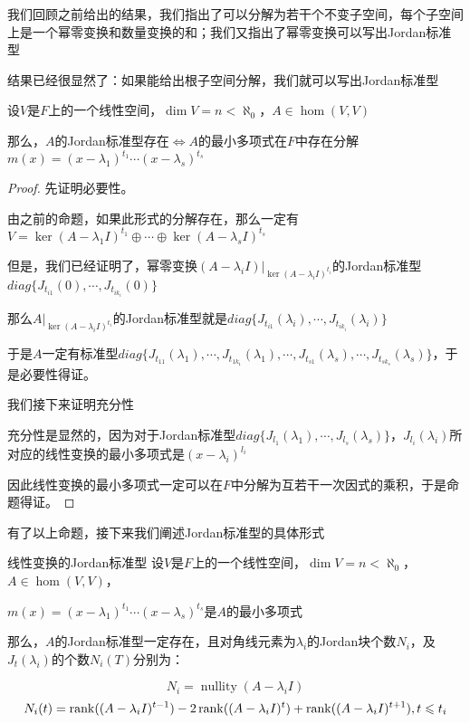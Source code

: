 \documentclass[12pt, a4paper, oneside, UTF8]{ctexbook}
\begin{document}
			我们回顾之前给出的结果，我们指出了可以分解为若干个不变子空间，每个子空间上是一个幂零变换和数量变换的和；我们又指出了幂零变换可以写出Jordan标准型

			结果已经很显然了：如果能给出根子空间分解，我们就可以写出Jordan标准型
			\begin{proposition}
				设$V$是$F$上的一个线性空间，$\dim V = n < \aleph_0$，$A \in \hom(V,V)$
							
				那么，$A$的Jordan标准型存在$ \Leftrightarrow A$的最小多项式在$F$中存在分解$m(x)=(x-\lambda_1)^{t_1}\cdots (x-\lambda_s)^{t_s}$
			\end{proposition}
			\begin{proof}
				先证明必要性。

				由之前的命题，如果此形式的分解存在，那么一定有$V = \ker (A-\lambda_1 I)^{t_1}\oplus \cdots \oplus \ker (A-\lambda_s I)^{t_s}$

				但是，我们已经证明了，幂零变换$(A-\lambda_i I)|_{\ker (A-\lambda_i I)^{t_i}}$的Jordan标准型$diag\{J_{t_{i1}}(0),\cdots,J_{t_{ik_i}}(0)\}$

				那么$A|_{\ker (A-\lambda_i I)^{t_i}}$的Jordan标准型就是$diag\{J_{t_{i1}}(\lambda_i),\cdots,J_{t_{ik_i}}(\lambda_i)\}$

				于是$A$一定有标准型$diag\{J_{t_{11}}(\lambda_1),\cdots,J_{t_{1k_1}}(\lambda_1),\cdots,J_{t_{s1}}(\lambda_s),\cdots,J_{t_{sk_s}}(\lambda_s)\}$，于是必要性得证。

				我们接下来证明充分性

				充分性是显然的，因为对于Jordan标准型$diag\{J_{l_1}(\lambda_1),\cdots,J_{l_s}(\lambda_s)\}$，$J_{l_i}(\lambda_i)$所对应的线性变换的最小多项式是$(x-\lambda_i)^{l_i}$

				因此线性变换的最小多项式一定可以在$F$中分解为互若干一次因式的乘积，于是命题得证。
			\end{proof}
			有了以上命题，接下来我们阐述Jordan标准型的具体形式
			\begin{them}{线性变换的Jordan标准型}{}
				设$V$是$F$上的一个线性空间，$\dim V = n < \aleph_0$，$A \in \hom(V,V)$，
							
				$m(x)=(x-\lambda_1)^{t_1}\cdots (x-\lambda_s)^{t_s}$是$A$的最小多项式

				那么，$A$的Jordan标准型一定存在，且对角线元素为$\lambda_i$的Jordan块个数$N_i$，及$J_{t}(\lambda_i)$的个数$N_i(T)$分别为：

				\begin{equation}
					N_i = \operatorname{nullity}(A-\lambda_i I)
				\end{equation}
				\begin{equation}
					N_i(t) = \operatorname{rank}((A-\lambda_i I)^{t-1})-2\operatorname{rank}((A-\lambda_i I)^t)+\operatorname{rank}((A-\lambda_i I)^{t+1}),t \leqslant t_i
				\end{equation}
			\end{them}
\end{document}
